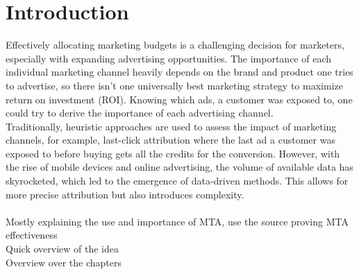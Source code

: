 \chapter{Introduction}
Effectively allocating marketing budgets is a challenging decision for marketers, especially with expanding advertising opportunities. 
The importance of each individual marketing channel heavily depends on the brand and product one tries to advertise, so there isn't one universally best marketing strategy to maximize return on investment (ROI). 
Knowing which ads, a customer was exposed to, one could try to derive the importance of each advertising channel. 
\\ 
Traditionally, heuristic approaches are used to assess the impact of marketing channels, for example, last-click attribution where the last ad a customer was exposed to before buying gets all the credits for the conversion. However, with the rise of mobile devices and online advertising, the volume of available data has skyrocketed, which led to the emergence of data-driven methods. This allows for more precise attribution but also introduces complexity. \\

\\
\color{red}
    Mostly explaining the use and importance of MTA, use the source proving MTA effectiveness \\
    Quick overview of the idea\\
    Overview over the chapters
\color{black}